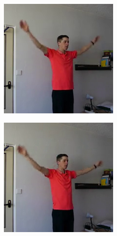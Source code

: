 \begin{figure}[!ht]
    \begin{subfigure}[b]{0.24\textwidth}
        \includegraphics[width=\linewidth]{figures/optical_flow/frame000000312.png}
    \end{subfigure}
    \begin{subfigure}[b]{0.24\textwidth}
        \includegraphics[width=\linewidth]{figures/optical_flow/frame000000386.png}

\end{subfigure}
\end{figure}

